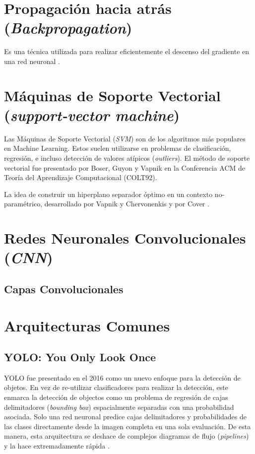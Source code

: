 \section{Propagaci\'on hacia atr\'as (\emph{Backpropagation})}

Es una t\'ecnica utilizada para realizar eficientemente el descenso del gradiente en una red neuronal \citep{10.5555/65669.104451}.


\section{M\'aquinas de Soporte Vectorial (\emph{support-vector machine})}
\label{intro:svm}

Las M\'aquinas de Soporte Vectorial (\emph{SVM}) son de los algoritmos m\'as populares en Machine Learning. Estos suelen utilizarse en problemas de clasificaci\'on, regresi\'on, e incluso detecci\'on de valores at\'ipicos (\emph{outliers}). El m\'etodo de soporte vectorial fue presentado por Boser, Guyon y Vapnik \citep{boser1992} en la Conferencia ACM de Teoría del Aprendizaje Computacional (COLT92).

\vspace*{0.5cm}

La idea de construir un hiperplano separador \'optimo en un contexto no-param\'etrico, desarrollado por Vapnik y Chervonenkis \citep{Vapnik:1964} y por Cover \citep{4038449}.


\section{Redes Neuronales Convolucionales (\emph{CNN})}
\label{intro:cnns}


\subsection{Capas Convolucionales}


\section{Arquitecturas Comunes}

\subsection{YOLO: You Only Look Once}
\label{teo:yolo}

YOLO fue presentado en el 2016 como un nuevo enfoque para la detecci\'on de objetos. En vez de re-utilizar clasificadores para realizar la detecci\'on, este enmarca la detecci\'on de objectos como un problema de regresi\'on de cajas delimitadores (\emph{bounding box}) espacialmente separadas con una probabilidad asociada. Solo una red neuronal predice cajas delimitadores y probabilidades de las clases directamente desde la imagen completa en una sola evaluaci\'on. De esta manera, esta arquitectura se deshace de complejos diagramas de flujo (\emph{pipelines}) y la hace extremadamente r\'apida \citep{redmon2016look}.

